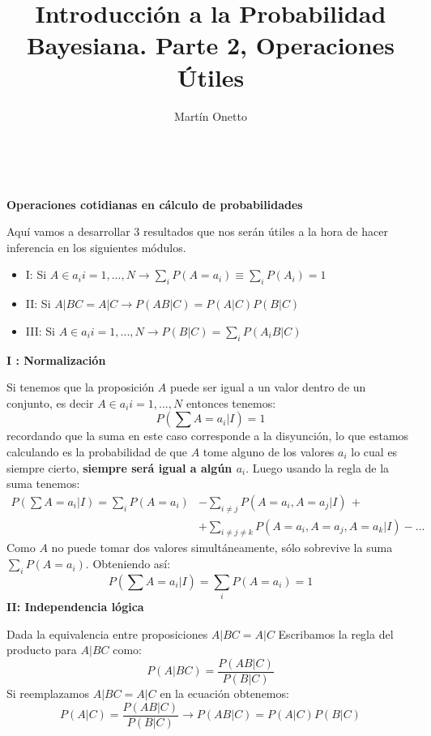 \documentclass[aps,onecolumn,12pt,notitlepage]{revtex4-1}
\begin{document}
\renewcommand{\andname}{y}
\renewcommand{\tablename}{Tabla}
\renewcommand{\labelenumi}{\Roman{enumi}.}

\title{Introducción a la Probabilidad Bayesiana.  Parte 2, Operaciones Útiles}
\author{Martín Onetto} 
\maketitle
\

\textbf{Operaciones cotidianas en cálculo de probabilidades}

Aquí vamos a desarrollar 3 resultados que nos serán útiles a la hora de hacer inferencia en los siguientes módulos.
\begin{itemize}
\item{I}: Si $A \in {a_{i}} i=1,...,N \rightarrow \sum_{i} P(A = a_{i}) \equiv  \sum_{i} P(A_{i})= 1$
\item{II}: Si $A|BC = A|C \rightarrow P(AB|C)=P(A|C)P(B|C)$
\item{III}: Si $A \in {a_{i}} i=1,...,N \rightarrow P(B|C) = \sum_{i}P(A_{i}B|C)$
\end{itemize}

\textbf{I : Normalización}

Si tenemos que la proposición $A$ puede ser igual a un valor dentro de un conjunto, es decir $A \in {a_{i}} i=1,...,N$ entonces tenemos:
\begin{equation}
P(\sum A=a_{i}|I) = 1
\end{equation}
recordando que la suma en este caso corresponde a la disyunción, lo que estamos calculando es la probabilidad de que $A$ tome alguno de los valores $a_{i}$ lo cual es siempre cierto, \textbf{siempre será igual a algún $a_{i}$}. Luego usando la regla de la suma tenemos:
\begin{equation}
\begin{aligned}
P(\sum A=a_{i}|I) = \sum_{i}P(A = a_{i}) &- \sum_{i\neq j}P(A=a_{i},A=a_{j}|I)\,+\\ &+\sum_{i\neq j\neq k}P(A=a_{i},A=a_{j},A=a_{k}|I) -...
\end{aligned}
\end{equation}
Como $A$ no puede tomar dos valores simultáneamente, sólo sobrevive la suma $\sum_{i}P(A = a_{i})$. Obteniendo así:
\begin{equation}
P(\sum A=a_{i}|I) = \sum_{i}P(A = a_{i}) = 1
\end{equation}
\newpage
\textbf{II: Independencia lógica}

Dada la equivalencia entre proposiciones $A|BC = A|C$  Escribamos la regla del producto para $A|BC$ como:
\begin{equation}
P(A|BC) = \frac{P(AB|C)}{P(B|C)}
\end{equation}
Si reemplazamos $A|BC = A|C$ en la ecuación obtenemos:
\begin{equation}
P(A|C) = \frac{P(AB|C)}{P(B|C)} \rightarrow P(AB|C) = P(A|C)P(B|C)
\end{equation}
\end{document}
